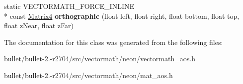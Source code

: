 \begin{DoxyCompactItemize}
\item 
\hypertarget{class_vectormath_1_1_aos_1_1_matrix4_abb5c6f60272399655f25c33c9122fa7c}{static V\+E\+C\+T\+O\+R\+M\+A\+T\+H\+\_\+\+F\+O\+R\+C\+E\+\_\+\+I\+N\+L\+I\+N\+E \\*
const \hyperlink{class_vectormath_1_1_aos_1_1_matrix4}{Matrix4} {\bfseries orthographic} (float left, float right, float bottom, float top, float z\+Near, float z\+Far)}\label{class_vectormath_1_1_aos_1_1_matrix4_abb5c6f60272399655f25c33c9122fa7c}

\end{DoxyCompactItemize}


The documentation for this class was generated from the following files\+:\begin{DoxyCompactItemize}
\item 
bullet/bullet-\/2.-\/r2704/src/vectormath/neon/vectormath\+\_\+aos.\+h\item 
bullet/bullet-\/2.-\/r2704/src/vectormath/neon/mat\+\_\+aos.\+h\end{DoxyCompactItemize}
